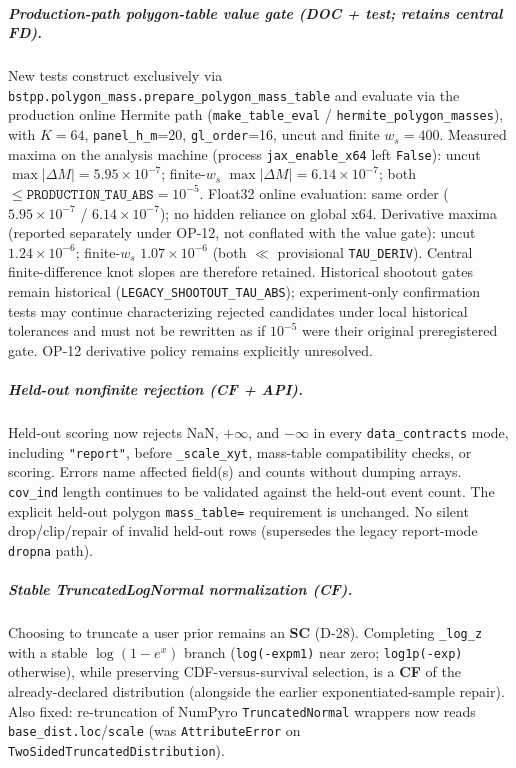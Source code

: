 \documentclass[
  10pt,
]{article}
\begin{document}
\subparagraph{Production-path polygon-table value gate (DOC + test; retains central FD).}
New tests construct exclusively via \texttt{bstpp.polygon\_mass.prepare\_polygon\_mass\_table} and evaluate via the production online Hermite path (\texttt{make\_table\_eval} / \texttt{hermite\_polygon\_masses}), with \(K{=}64\), \texttt{panel\_h\_m}=20, \texttt{gl\_order}=16, uncut and finite \(w_s{=}400\).
Measured maxima on the analysis machine (process \texttt{jax\_enable\_x64} left \texttt{False}):
uncut \(\max|\Delta M| = 5.95\times 10^{-7}\); finite-\(w_s\) \(\max|\Delta M| = 6.14\times 10^{-7}\); both \(\le \texttt{PRODUCTION\_TAU\_ABS}=10^{-5}\).
Float32 online evaluation: same order (\(5.95\times 10^{-7}\) / \(6.14\times 10^{-7}\)); no hidden reliance on global x64.
Derivative maxima (reported separately under OP-12, not conflated with the value gate): uncut \(1.24\times 10^{-6}\); finite-\(w_s\) \(1.07\times 10^{-6}\) (both \(\ll\) provisional \texttt{TAU\_DERIV}).
Central finite-difference knot slopes are therefore retained.
Historical shootout gates remain historical (\texttt{LEGACY\_SHOOTOUT\_TAU\_ABS}); experiment-only confirmation tests may continue characterizing rejected candidates under local historical tolerances and must not be rewritten as if \(10^{-5}\) were their original preregistered gate.
OP-12 derivative policy remains explicitly unresolved.

\subparagraph{Held-out nonfinite rejection (CF + API).}
Held-out scoring now rejects NaN, \(+\infty\), and \(-\infty\) in every \texttt{data\_contracts} mode, including \texttt{"report"}, before \texttt{\_scale\_xyt}, mass-table compatibility checks, or scoring.
Errors name affected field(s) and counts without dumping arrays.
\texttt{cov\_ind} length continues to be validated against the held-out event count.
The explicit held-out polygon \texttt{mass\_table=} requirement is unchanged.
No silent drop/clip/repair of invalid held-out rows (supersedes the legacy report-mode \texttt{dropna} path).

\subparagraph{Stable TruncatedLogNormal normalization (CF).}
Choosing to truncate a user prior remains an \textbf{SC} (D-28).
Completing \texttt{\_log\_z} with a stable \(\log(1-e^{x})\) branch (\texttt{log(-expm1)} near zero; \texttt{log1p(-exp)} otherwise), while preserving CDF-versus-survival selection, is a \textbf{CF} of the already-declared distribution (alongside the earlier exponentiated-sample repair).
Also fixed: re-truncation of NumPyro \texttt{TruncatedNormal} wrappers now reads \texttt{base\_dist.loc}/\texttt{scale} (was \texttt{AttributeError} on \texttt{TwoSidedTruncatedDistribution}).
\end{document}
